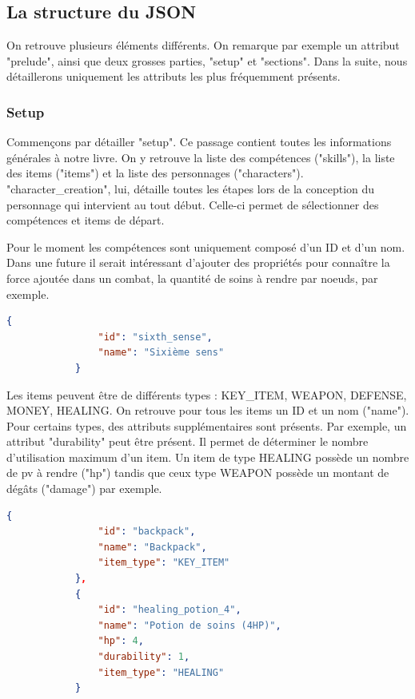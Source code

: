 		\subsection{La structure du JSON}

		On retrouve plusieurs éléments différents. On remarque par exemple un attribut "prelude", ainsi que deux grosses parties, "setup" et "sections". Dans la suite, nous détaillerons uniquement les attributs les plus fréquemment présents.

		\subsubsection{Setup}

			Commençons par détailler "setup". Ce passage contient toutes les informations générales à notre livre. On y retrouve la liste des compétences ("skills"), la liste des items ("items") et la liste des personnages ("characters"). "character\_creation", lui, détaille toutes les étapes lors de la conception du personnage qui intervient au tout début. Celle-ci permet de sélectionner des compétences et items de départ.

			Pour le moment les compétences sont uniquement composé d'un ID et d'un nom. Dans une future \maj{} il serait intéressant d'ajouter des propriétés pour connaître la force ajoutée dans un combat, la quantité de soins à rendre par noeuds, par exemple.

			\begin{lstlisting}[gobble=12, language=json, caption=Exemple de compétence]
			{
				"id": "sixth_sense",
				"name": "Sixième sens"
			}
			\end{lstlisting}

			Les items peuvent être de différents types : KEY\_ITEM, WEAPON, DEFENSE, MONEY, HEALING. On retrouve pour tous les items un ID et un nom ("name"). Pour certains types, des attributs supplémentaires sont présents. Par exemple, un attribut "durability" peut être présent. Il permet de déterminer le nombre d'utilisation maximum d'un item. Un item de type HEALING possède un nombre de pv à rendre ("hp") tandis que ceux type WEAPON possède un montant de dégâts ("damage") par exemple.

			\begin{lstlisting}[gobble=12, language=json, caption=Exemple d'items]
			{
				"id": "backpack",
				"name": "Backpack",
				"item_type": "KEY_ITEM"
			},
			{
				"id": "healing_potion_4",
				"name": "Potion de soins (4HP)",
				"hp": 4,
				"durability": 1,
				"item_type": "HEALING"
			}
			\end{lstlisting}

